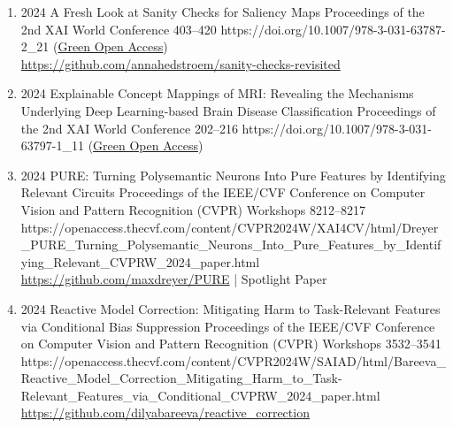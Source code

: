{\begin{enumerate}
        \item {}
                            {2024}
                            {A Fresh Look at Sanity Checks for Saliency Maps}
                            {Proceedings of the 2nd XAI World Conference}
                            {403--420}
                            {https://doi.org/10.1007/978-3-031-63787-2_21}
                            {(\href{https://arxiv.org/abs/2405.02383}{Green Open Access})
                            \\\href{https://github.com/annahedstroem/sanity-checks-revisited}{https://github.com/annahedstroem/sanity-checks-revisited}}

        \item {}
                            {2024}
                            {Explainable Concept Mappings of MRI: Revealing the Mechanisms Underlying Deep Learning-based Brain Disease Classification}
                            {Proceedings of the 2nd XAI World Conference}
                            {202--216}
                            {https://doi.org/10.1007/978-3-031-63797-1_11}
                            {(\href{https://arxiv.org/abs/2404.10433}{Green Open Access})}


        \item {}
                            {2024}
                            {PURE: Turning Polysemantic Neurons Into Pure Features by Identifying Relevant Circuits}
                            {Proceedings of the IEEE/CVF Conference on Computer Vision and Pattern Recognition (CVPR) Workshops}
                            {8212--8217}
                            {https://openaccess.thecvf.com/content/CVPR2024W/XAI4CV/html/Dreyer_PURE_Turning_Polysemantic_Neurons_Into_Pure_Features_by_Identifying_Relevant_CVPRW_2024_paper.html}
                            {\\\href{https://github.com/maxdreyer/PURE}{https://github.com/maxdreyer/PURE} | 
                            Spotlight Paper}

        \item {}
                            {2024}
                            {Reactive Model Correction: Mitigating Harm to Task-Relevant Features via Conditional Bias Suppression}
                            {Proceedings of the IEEE/CVF Conference on Computer Vision and Pattern Recognition (CVPR) Workshops}
                            {3532--3541}
                            {https://openaccess.thecvf.com/content/CVPR2024W/SAIAD/html/Bareeva_Reactive_Model_Correction_Mitigating_Harm_to_Task-Relevant_Features_via_Conditional_CVPRW_2024_paper.html}
                            {\\\href{https://github.com/dilyabareeva/reactive_correction}{https://github.com/dilyabareeva/reactive\_correction}}                           


\end{enumerate}}
